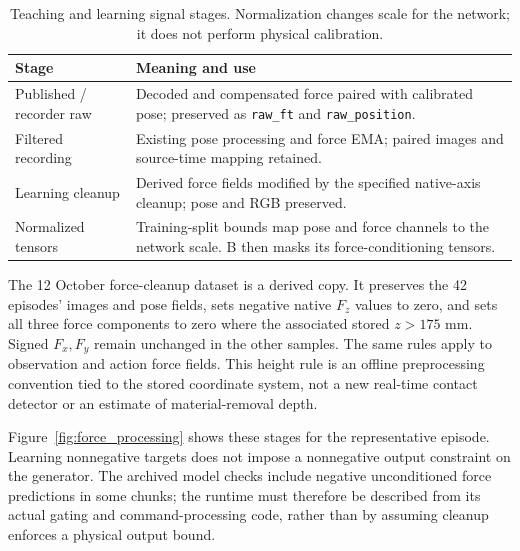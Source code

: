\begin{table}[tbp]\centering\small
\caption[Teaching and learning signal stages]{Teaching and learning signal stages. Normalization changes scale for the network; it does not perform physical calibration.}
\label{tab:signal_stages}
\begin{tabularx}{\textwidth}{P{0.25\textwidth}X}
\toprule Stage & Meaning and use \\ \midrule
Published / recorder raw & Decoded and compensated force paired with calibrated pose; preserved as \texttt{raw\_ft} and \texttt{raw\_position}. \\
Filtered recording & Existing pose processing and force EMA; paired images and source-time mapping retained. \\
Learning cleanup & Derived force fields modified by the specified native-axis cleanup; pose and RGB preserved. \\
Normalized tensors & Training-split bounds map pose and force channels to the network scale. B then masks its force-conditioning tensors. \\
\bottomrule
\end{tabularx}
\end{table}

The 12 October force-cleanup dataset is a derived copy. It preserves the 42 episodes' images and pose fields, sets negative native \(F_z\) values to zero, and sets all three force components to zero where the associated stored \(z>175\) mm. Signed \(F_x,F_y\) remain unchanged in the other samples. The same rules apply to observation and action force fields. This height rule is an offline preprocessing convention tied to the stored coordinate system, not a new real-time contact detector or an estimate of material-removal depth.

Figure~\ref{fig:force_processing} shows these stages for the representative episode. Learning nonnegative targets does not impose a nonnegative output constraint on the generator. The archived model checks include negative unconditioned force predictions in some chunks; the runtime must therefore be described from its actual gating and command-processing code, rather than by assuming cleanup enforces a physical output bound.


